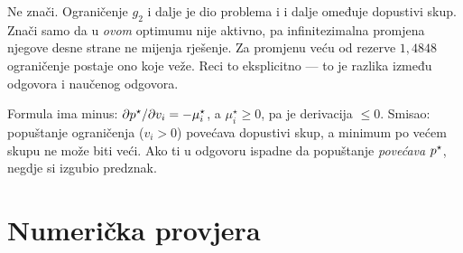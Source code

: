 \begin{zamka}[Zamka: ,,$\mu_2 = 0$ znači da ograničenje ne treba``]
Ne znači. Ograničenje $g_2$ i dalje je dio problema i i dalje omeđuje dopustivi
skup. Znači samo da u \emph{ovom} optimumu nije aktivno, pa infinitezimalna
promjena njegove desne strane ne mijenja rješenje. Za promjenu veću od rezerve
$1{,}4848$ ograničenje postaje ono koje veže. Reci to eksplicitno --- to je
razlika između odgovora i naučenog odgovora.
\end{zamka}

\begin{zamka}
Formula ima minus: $\partial p^{\star}/\partial v_i = -\mu_i^{\star}$, a $\mu_i^{\star} \geq 0$,
pa je derivacija $\leq 0$. Smisao: popuštanje ograničenja ($v_i > 0$) povećava
dopustivi skup, a minimum po većem skupu ne može biti veći. Ako ti u odgovoru
ispadne da popuštanje \emph{povećava} $p^{\star}$, negdje si izgubio predznak.
\end{zamka}

\section{Numerička provjera}
\label{sec:z1f-provjera}

